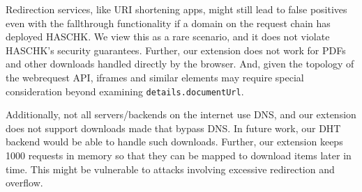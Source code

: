 Redirection services, like URI shortening apps, might still lead to false
positives even with the fallthrough functionality if a domain on the request
chain has deployed HASCHK. We view this as a rare scenario, and it does not
violate HASCHK's security guarantees. Further, our extension does not work
for PDFs and other downloads handled directly by the browser. And, given the
topology of the webrequest API, iframes and similar elements may require special
consideration beyond examining \texttt{details.documentUrl}.

Additionally, not all servers/backends on the internet use DNS, and our
extension does not support downloads made that bypass DNS. In future work, our
DHT backend would be able to handle such downloads. Further, our extension keeps
1000 requests in memory so that they can be mapped to download items later in
time. This might be vulnerable to attacks involving excessive redirection and
overflow.
